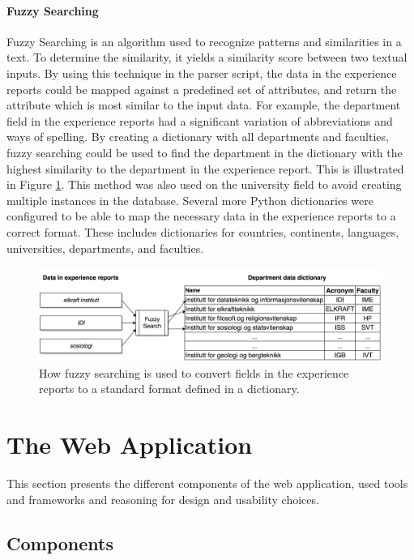 \paragraph{Fuzzy Searching}

Fuzzy Searching is an algorithm used to recognize patterns and similarities in a text. To determine the similarity, it yields a similarity score between two textual inputs. By using this technique in the parser script, the data in the experience reports could be mapped against a predefined set of attributes, and return the attribute which is most similar to the input data. For example, the department field in the experience reports had a significant variation of abbreviations and ways of spelling. By creating a dictionary with all departments and faculties, fuzzy searching could be used to find the department in the dictionary with the highest similarity to the department in the experience report. This is illustrated in Figure \ref{fig:fuzzy_searching}. This method was also used on the university field to avoid creating multiple instances in the database. Several more Python dictionaries were configured to be able to map the necessary data in the experience reports to a correct format. These includes dictionaries for countries, continents, languages, universities, departments, and faculties.

\begin{figure}[h]
    \centering
    \includegraphics[width=1.0\textwidth]{fig/fuzzy_search2.png}
    \caption[Fuzzy searching]{How fuzzy searching is used to convert fields in the experience reports to a standard format defined in a dictionary.}
    \label{fig:fuzzy_searching}
\end{figure}

\section{The Web Application}

This section presents the different components of the web application, used tools and frameworks and reasoning for design and usability choices.

\subsection{Components}

